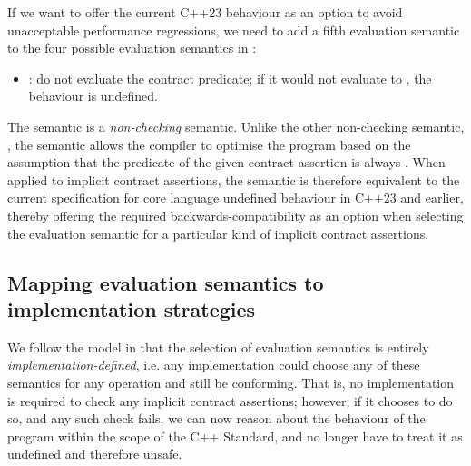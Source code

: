 If we want to offer the current C++23 behaviour as an option to avoid unacceptable performance regressions, we need to add a fifth evaluation semantic to the four possible evaluation semantics in \cite{P2900R7}:
\begin{itemize}
\item {}: do not evaluate the contract predicate; if it would not evaluate to , the behaviour is undefined.
\end{itemize}
The  semantic is a \emph{non-checking} semantic. Unlike the other non-checking semantic, , the  semantic allows the compiler to optimise the program based on the assumption that the predicate of the given contract assertion is always . When applied to implicit contract assertions, the  semantic is therefore equivalent to the current specification for core language undefined behaviour in C++23 and earlier, thereby offering the required backwards-compatibility as an option when selecting the evaluation semantic for a particular kind of implicit contract assertions.

\subsection{Mapping evaluation semantics to implementation strategies}

We follow the model in \cite{P2900R7} that the selection of evaluation semantics is entirely \emph{implementation-defined}, i.e. any implementation could choose any of these semantics for any operation and still be conforming. That is, no implementation is required to check any implicit contract assertions; however, if it chooses to do so, and any such check fails, we can now reason about the behaviour of the program within the scope of the C++ Standard, and no longer have to treat it as undefined and therefore unsafe.

